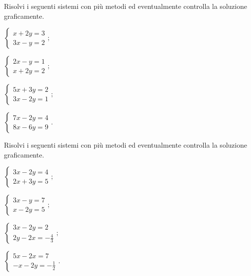 \begin{esercizio}[\Ast]
 \label{ese:19.70}
 Risolvi i seguenti sistemi con più metodi ed eventualmente controlla
la soluzione graficamente.
\begin{multicols}{2}
\begin{enumeratea}
\item $\left\{\begin{array}{l}x+2y=3 \\3x-y=2\end{array}\right.;$
\item $\left\{\begin{array}{l}2x-y=1 \\x+2y=2\end{array}\right.;$
\item $\left\{\begin{array}{l}5x+3y=2 \\3x-2y=1\end{array}\right.;$
\item $\left\{\begin{array}{l}7x-2y=4\\8x-6y=9 \end{array}\right..$
\end{enumeratea}
\end{multicols}
\end{esercizio}

\begin{esercizio}[\Ast]
 \label{ese:19.71}
 Risolvi i seguenti sistemi con più metodi ed eventualmente controlla
la soluzione graficamente.
\begin{multicols}{2}
\begin{enumeratea}
\item $\left\{\begin{array}{l}3x-2y=4 \\2x+3y=5\end{array}\right.;$
\item $\left\{\begin{array}{l}3x-y=7 \\x-2y=5 \end{array}\right.;$
\item $\left\{\begin{array}{l}3x-2y=2\\2y-2x=-{\frac{4}{3}} \end{array}\right.;$
\item $\left\{\begin{array}{l}5x-2x=7\\-x-2y=-{\frac{1}{2}} \end{array}\right..$
\end{enumeratea}
\end{multicols}
\end{esercizio}

